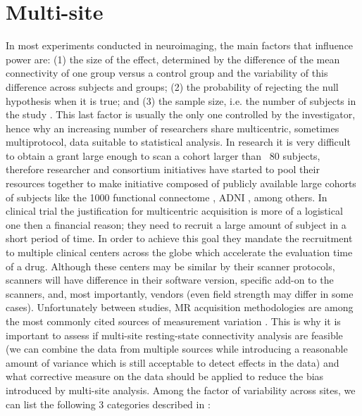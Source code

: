 \section{Multi-site}
In most experiments conducted in neuroimaging, the main factors that influence power are: (1) the size of the effect, determined by the difference of the mean connectivity of one group versus a control group and the variability of this difference across subjects and groups; (2) the probability of rejecting the null hypothesis when it is true; and (3) the sample size, i.e. the number of subjects in the study \citep{Desmond2002}. This last factor is usually the only one controlled by the investigator, hence why an increasing number of researchers share multicentric, sometimes multiprotocol, data suitable to statistical analysis. In research it is very difficult to obtain a grant large enough to scan a cohort larger than ~80 subjects, therefore researcher and consortium initiatives have started to pool their resources together to make initiative composed of publicly available large cohorts of subjects like the 1000 functional connectome \citep{Biswal2010}, ADNI \citep{
Mueller2005}, among 
others. In clinical trial the justification for multicentric acquisition is more of a logistical one then a financial reason; they need to recruit a large amount of subject in a short period of time. In order to achieve this goal they mandate the recruitment to multiple clinical centers across the globe which accelerate the evaluation time of a drug. Although these centers may be similar by their scanner protocols, scanners will have difference in their software version, specific add-on to the scanners, and, most importantly, vendors (even field strength may differ in some cases). Unfortunately between studies, MR acquisition methodologies are among the most commonly cited sources of measurement variation \citep{Friedman2006}. This is why it is important to assess if multi-site resting-state connectivity analysis are feasible (we can combine the data from multiple sources while introducing a reasonable amount of variance which is still acceptable to detect effects in the data) and what corrective measure on 
the data should be applied to reduce the bias introduced by multi-site analysis. Among the factor of variability across sites, we can list the following 3 categories described in \citep{Yan2013a}:


